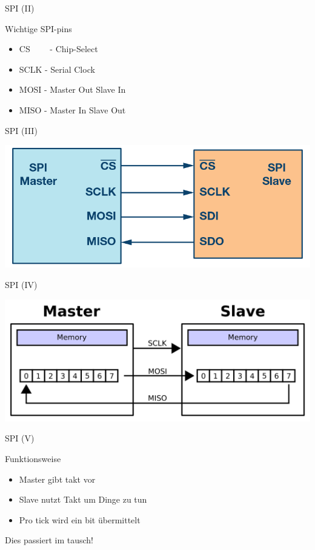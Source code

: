   \begin{frame} {SPI (II)}
    \begin{block} {Wichtige SPI-pins}
      \begin{itemize}
        \item CS ~~~~- Chip-Select
        \item SCLK - Serial Clock
        \item MOSI - Master Out Slave In
        \item MISO - Master In Slave Out
      \end{itemize}
    \end{block}
  \end{frame}

  \begin{frame} {SPI (III)}
    \begin{center}
      \includegraphics[width=.8\textwidth]{figs/SPI-single.png}
    \end{center}
  \end{frame}

  \begin{frame} {SPI (IV)}
    \begin{center}
      \includegraphics[width=\textwidth]{figs/SPI-transfer}
    \end{center}
  \end{frame}

  \begin{frame} {SPI (V)}
   \begin{block} {Funktionsweise}
      \begin{itemize}
        \item Master gibt takt vor
        \item Slave nutzt Takt um Dinge zu tun
        \item Pro tick wird ein bit übermittelt
      \end{itemize}
    \end{block}
    \begin{alertblock} {}
      Dies passiert im tausch!
    \end{alertblock}
  \end{frame}

